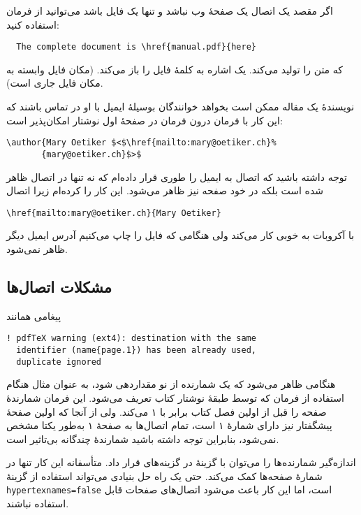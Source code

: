 {اگر مقصد یک اتصال یک صفحهٔ وب نباشد و تنها یک فایل باشد می‌توانید از فرمان   استفاده کنید: 

\setLR
\begin{verbatim}
  The complete document is \href{manual.pdf}{here}
\end{verbatim}
\setRL

که متن 
 را تولید می‌کند.
یک اشاره به کلمهٔ 
  فایل   را باز می‌کند. 
(مکان فایل وابسته به مکان فایل جاری است).

نویسندهٔ یک مقاله ممکن است بخواهد خوانندگان بوسیلهٔ ایمیل با او در تماس باشند که این کار با فرمان  درون فرمان  در صفحهٔ اول نوشتار‌ امکان‌پذیر است:

\setLR
\begin{code}
\begin{verbatim}
\author{Mary Oetiker $<$\href{mailto:mary@oetiker.ch}%
       {mary@oetiker.ch}$>$
\end{verbatim}
\end{code}
\setRL

توجه داشته باشید که اتصال به ایمیل را طوری قرار داده‌ام که نه تنها در اتصال ظاهر شده است بلکه در خود صفحه نیز ظاهر می‌شود. این کار را کرده‌ام زیرا اتصال

\setLR
\verb+\href{mailto:mary@oetiker.ch}{Mary Oetiker}+\\
\setRL

با آکروبات به خوبی کار می‌کند ولی هنگامی که فایل را چاپ می‌کنیم آدرس ایمیل دیگر ظاهر نمی‌شود.

\subsection{مشکلات اتصال‌ها}
پیغامی همانند 

\setLR
\begin{verbatim}
! pdfTeX warning (ext4): destination with the same
  identifier (name{page.1}) has been already used,
  duplicate ignored
\end{verbatim}
\setRL

هنگامی ظاهر می‌شود که یک شمارنده از نو مقداردهی شود، به عنوان مثال هنگام استفاده از فرمان   که توسط طبقهٔ نوشتار کتاب تعریف می‌شود. این فرمان شمارندهٔ صفحه را قبل از اولین فصل کتاب برابر با ۱ می‌کند. ولی از آنجا که اولین صفحهٔ پیشگفتار نیز دارای شمارهٔ ۱ است، تمام اتصال‌ها به صفحهٔ ۱ به‌طور یکتا مشخص نمی‌شود،   بنابراین توجه داشته باشید شمارندهٔ چندگانه بی‌تاثیر است.

اندازه‌گیر شمارنده‌ها را می‌توان با گزینهٔ  در گزینه‌های  قرار داد. متأسفانه این کار تنها در شمارهٔ صفحه‌ها کمک می‌کند.
حتی یک راه حل بنیادی می‌تواند استفاده از گزینهٔ \texttt{hypertexnames=false} است، اما این کار باعث می‌شود اتصال‌های صفحات قابل استفاده نباشند.

}
